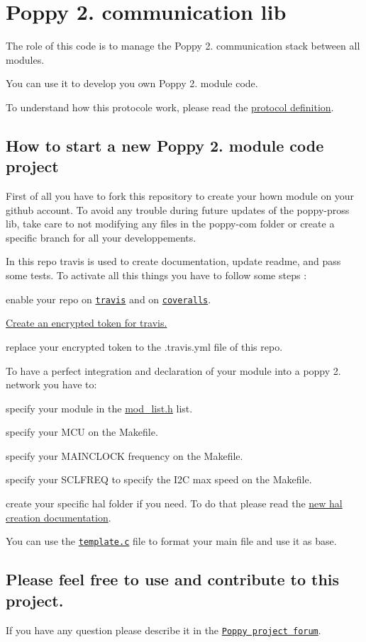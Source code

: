 \section*{Poppy 2. communication lib }

The role of this code is to manage the Poppy 2. communication stack between all modules.

You can use it to develop you own Poppy 2. module code.

To understand how this protocole work, please read the \hyperlink{protocol__definition_8md_source}{protocol definition}.

\subsection*{How to start a new Poppy 2. module code project }

First of all you have to fork this repository to create your hown module on your github account. To avoid any trouble during future updates of the poppy-\/pross lib, take care to not modifying any files in the poppy-\/com folder or create a specific branch for all your developpements. 



In this repo travis is used to create documentation, update readme, and pass some tests. To activate all this things you have to follow some steps \-:
\begin{DoxyItemize}
\item enable your repo on \href{https://travis-ci.org/}{\tt travis} and on \href{https://coveralls.io}{\tt coveralls}.
\item \hyperlink{travis__encrypt_8md_source}{Create an encrypted token for travis.}
\item replace your encrypted token to the .travis.\-yml file of this repo.
\end{DoxyItemize}





To have a perfect integration and declaration of your module into a poppy 2. network you have to\-:
\begin{DoxyItemize}
\item specify your module in the \hyperlink{mod__list_8h_source}{mod\-\_\-list.\-h} list.
\item specify your M\-C\-U on the Makefile.
\item specify your M\-A\-I\-N\-C\-L\-O\-C\-K frequency on the Makefile.
\item specify your S\-C\-L\-F\-R\-E\-Q to specify the I2\-C max speed on the Makefile.
\item create your specific hal folder if you need. To do that please read the \hyperlink{hal__creation_8md_source}{new hal creation documentation}.
\end{DoxyItemize}

You can use the \href{template.c}{\tt template.\-c} file to format your main file and use it as base.





\subsection*{Please feel free to use and contribute to this project. }

If you have any question please describe it in the \href{https://forum.poppy-project.org}{\tt Poppy project forum}. 